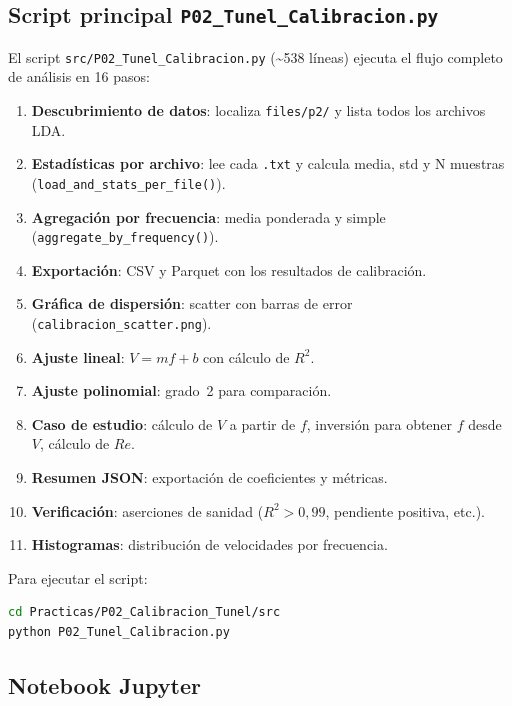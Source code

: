 \documentclass[12pt,a4paper]{article}
\begin{document}
\subsection{Script principal \texttt{P02\_Tunel\_Calibracion.py}}

El script \texttt{src/P02\_Tunel\_Calibracion.py} (\textasciitilde538 líneas)
ejecuta el flujo completo de análisis en 16 pasos:

\begin{enumerate}
	\item \textbf{Descubrimiento de datos}: localiza \texttt{files/p2/} y
	      lista todos los archivos LDA.
	\item \textbf{Estadísticas por archivo}: lee cada \texttt{.txt} y calcula
	      media, std y N muestras (\texttt{load\_and\_stats\_per\_file()}).
	\item \textbf{Agregación por frecuencia}: media ponderada y simple
	      (\texttt{aggregate\_by\_frequency()}).
	\item \textbf{Exportación}: CSV y Parquet con los resultados de
	      calibración.
	\item \textbf{Gráfica de dispersión}: scatter con barras de error
	      (\texttt{calibracion\_scatter.png}).
	\item \textbf{Ajuste lineal}: $V = mf + b$ con cálculo de $R^2$.
	\item \textbf{Ajuste polinomial}: grado~2 para comparación.
	\item \textbf{Caso de estudio}: cálculo de $V$ a partir de $f$, inversión
	      para obtener $f$ desde $V$, cálculo de $Re$.
	\item \textbf{Resumen JSON}: exportación de coeficientes y métricas.
	\item \textbf{Verificación}: aserciones de sanidad ($R^2 > 0{,}99$,
	      pendiente positiva, etc.).
	\item \textbf{Histogramas}: distribución de velocidades por frecuencia.
\end{enumerate}

Para ejecutar el script:
\begin{lstlisting}[language=bash,caption={Ejecución del script principal.}]
cd Practicas/P02_Calibracion_Tunel/src
python P02_Tunel_Calibracion.py
\end{lstlisting}

\subsection{Notebook Jupyter}
\end{document}
